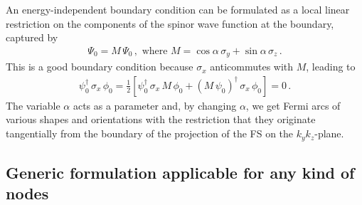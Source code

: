 \documentclass[aps,prb,onecolumn, footinbib, 10pt]{revtex4-2}
\begin{document}
An energy-independent
boundary condition can be formulated as a local linear restriction on the components of the spinor wave function at the boundary, captured by \cite{witten}
\begin{align}
\label{eqalpha}
\Psi_0 =  M \, \Psi_0\,, \text{ where } M = \cos \alpha \, \sigma_y + \sin  \alpha \, \sigma_z \,.
\end{align}
This is a good boundary condition because $\sigma_x $ anticommutes with $M$, leading to
\begin{align}
 \psi_0^\dagger\, \sigma_x \, \phi_0 = 
 \frac{1}{2} \left[ \psi_0^\dagger\, \sigma_x \,M\, \phi_0 
 + ( M\, \psi_0)^\dagger\, \sigma_x \, \phi_0 \right ]
  = 0\,.
\end{align}
The variable $\alpha $ acts as a parameter and, by changing $\alpha$, we get Fermi arcs of various shapes and orientations with the restriction that they originate tangentially from the boundary of the projection of the FS on the $k_y k_z$-plane.


\subsection{Generic formulation applicable for any kind of nodes}
\label{secgen_method}
\end{document}
